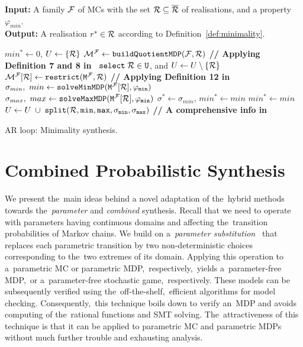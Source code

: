 \begin{algorithm}[h!]
\hspace*{\algorithmicindent} \textbf{Input:} A family $\mathcal{F}$ of MCs with the set $\mathcal{R} \subseteq \overline{\mathcal{R}}$ of realisations, and a property $\varphi_{min}$. \\
\hspace*{\algorithmicindent} \textbf{Output:}  A realisation $r^* \in \mathcal{R}$ according to Definition~\ref{def:minimality}. \\
\vspace*{-1.5em}
\begin{algorithmic}[1]
    \STATE $min^* \leftarrow 0$, $U \leftarrow \{ \mathcal{R} \}$
    \STATE $\mathcal{M}^{\mathcal{F}} \leftarrow \mathtt{buildQuotientMDP(\mathcal{F}, \mathcal{R})}$ \hfill \textbf{// Applying Definition 7 and 8 in~\cite{cegar}}
        \STATE $\mathtt{select \; \mathcal{R} \in U}$, and $U \leftarrow U \setminus \{ \mathcal{R} \}$
        \STATE $\mathcal{M}^{\mathcal{F}}[\mathcal{R}] \leftarrow \mathtt{restrict(M^{\mathcal{F}}, \mathcal{R})}$ \hfill \textbf{// Applying Definition 12 in~\cite{cegar}}
        \STATE $\sigma_{min}, \ min \leftarrow \mathtt{solveMinMDP(M^{\mathcal{F}}[\mathcal{R}], \varphi_{min})}$
        \STATE $\sigma_{max}, \ max \leftarrow \mathtt{solveMaxMDP(M^{\mathcal{F}}[\mathcal{R}], \varphi_{min})}$
                \STATE $\sigma^* \leftarrow \sigma_{min}$, $min^* \leftarrow min$
            \ELSE
                    \STATE $min^* \leftarrow min$
                \ENDIF
                \STATE $U \leftarrow U \; \cup \; \mathtt{split(\mathcal{R}, min, max, \sigma_{min}, \sigma_{max})}$ \hfill \textbf{// A comprehensive info in~\cite{cegar}}
            \ENDIF
        \ENDIF
    \ENDWHILE
\end{algorithmic}
\caption{AR loop: Minimality synthesis.}
\label{alg:ar_optimal}
\end{algorithm}

\section{Combined Probabilistic Synthesis}
We present the~main ideas behind a novel adaptation of the~hybrid methods towards the~\textit{parameter} and \textit{combined} synthesis.
Recall that we need to operate with parameters having continuous domains and affecting the~transition probabilities of Markov chains.
We build on a~\emph{parameter substitution}~\cite{Quatmann2016}
that replaces each parametric transition by two non-deterministic choices corresponding to the~two extremes of its domain.
Applying this operation to a~parametric MC or parametric MDP,~respectively,~yields a~parameter-free MDP,~or a~parameter-free stochastic game,~respectively.
These models can be subsequently verified using the~off-the-shelf,~efficient algorithms for model checking.
Consequently,~this technique boils down to verify an~MDP and avoids computing of the~rational functions and SMT solving.
The~attractiveness of this technique is that it can be applied to parametric MC and parametric MDPs without much further trouble and exhausting analysis.

